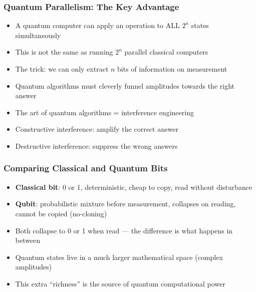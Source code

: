 \begin{frame}[fragile]\frametitle{Quantum Parallelism: The Key Advantage}
\begin{itemize}
\item A quantum computer can apply an operation to ALL $2^n$ states simultaneously
\item This is not the same as running $2^n$ parallel classical computers
\item The trick: we can only extract $n$ bits of information on measurement
\item Quantum algorithms must cleverly funnel amplitudes towards the right answer
\item The art of quantum algorithms = interference engineering
\item Constructive interference: amplify the correct answer
\item Destructive interference: suppress the wrong answers
\end{itemize}
\end{frame}

\begin{frame}[fragile]\frametitle{Comparing Classical and Quantum Bits}
\begin{itemize}
\item \textbf{Classical bit}: 0 or 1, deterministic, cheap to copy, read without disturbance
\item \textbf{Qubit}: probabilistic mixture before measurement, collapses on reading, cannot be copied (no-cloning)
\item Both collapse to 0 or 1 when read --- the difference is what happens in between
\item Quantum states live in a much larger mathematical space (complex amplitudes)
\item This extra ``richness'' is the source of quantum computational power
\end{itemize}
\end{frame}

